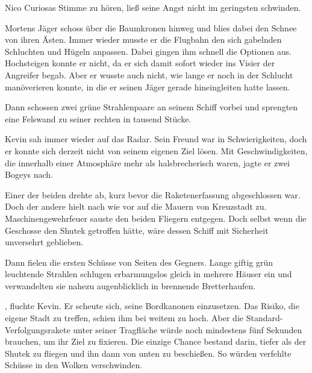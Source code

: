\par

 Nico Curiosas Stimme zu hören, ließ seine Angst nicht im geringsten schwinden. 

\par

Mortens Jäger schoss über die Baumkronen hinweg und blies dabei den Schnee von ihren Ästen. Immer wieder musste er die Flugbahn den sich gabelnden Schluchten und Hügeln anpassen. Dabei gingen ihm schnell die Optionen aus. Hochsteigen konnte er nicht, da er sich damit sofort wieder ins Visier der Angreifer begab. Aber er wusste auch nicht, wie lange er noch in der Schlucht manöverieren konnte, in die er seinen Jäger gerade hineingleiten hatte lassen.

\par

Dann schossen zwei grüne Strahlenpaare an seinem Schiff vorbei und sprengten eine Felswand  zu seiner rechten in tausend Stücke.

\par

Kevin sah immer wieder auf das Radar. Sein Freund war in Schwierigkeiten, doch er konnte sich derzeit nicht von seinem eigenen Ziel lösen. Mit Geschwindigkeiten, die innerhalb einer Atmosphäre mehr als halsbrecherisch waren, jagte er zwei Bogeys nach.

\par

Einer der beiden drehte ab, kurz bevor die Raketenerfassung abgeschlossen war. Doch der andere hielt nach wie vor auf die Mauern von Kreuzstadt zu. Maschinengewehrfeuer sauste den beiden Fliegern entgegen. Doch selbst wenn die Geschosse den Shutek getroffen hätte, wäre dessen Schiff mit Sicherheit unversehrt geblieben.

\par

Dann fielen die ersten Schüsse von Seiten des Gegners. Lange giftig grün leuchtende Strahlen schlugen erbarmungslos gleich in mehrere Häuser ein und verwandelten sie nahezu augenblicklich in brennende Bretterhaufen.

\par

, fluchte Kevin. Er scheute sich, seine Bordkanonen einzusetzen. Das Risiko, die eigene Stadt zu treffen, schien ihm bei weitem zu hoch. Aber die Standard-Verfolgungsrakete unter seiner Tragfläche würde noch mindestens fünf Sekunden brauchen, um ihr Ziel zu fixieren. Die einzige Chance bestand darin, tiefer als der Shutek zu fliegen und ihn dann von unten zu beschießen. So würden verfehlte Schüsse in den Wolken verschwinden.

